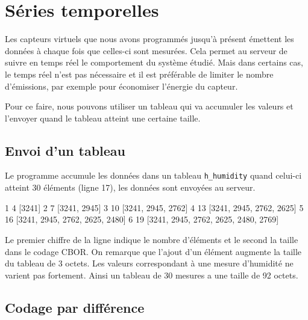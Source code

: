 \cleardoublepage

\chapter{Séries temporelles}

\begin{figure}
\end{figure}

Les capteurs virtuels que nous avons programmés jusqu’à présent émettent les données à chaque fois que celles-ci sont mesurées. 
Cela permet au serveur de suivre en temps réel le comportement du système étudié. 
Mais dans certains cas, le temps réel n’est pas nécessaire et il est préférable de limiter le nombre d’émissions, par exemple pour économiser l'énergie du capteur.

Pour ce faire, nous pouvons utiliser un tableau qui va accumuler les valeurs et l’envoyer quand le tableau atteint une certaine taille.


\section{Envoi d'un tableau}

Le programme  accumule les données dans un tableau \texttt{h\_humidity} quand celui-ci atteint 30 éléments (ligne 17), les données sont envoyées au serveur.




\begin{termc}[backgroundcolor=\color{palerod}, basicstyle=\ttfamily\small, escapechar=\#]
1 4 [3241]
2 7 [3241, 2945]
3 10 [3241, 2945, 2762]
4 13 [3241, 2945, 2762, 2625]
5 16 [3241, 2945, 2762, 2625, 2480]
6 19 [3241, 2945, 2762, 2625, 2480, 2769]
\end{termc}

Le premier chiffre de la ligne indique le nombre d'éléments et le second la taille dans le codage CBOR. On remarque que l'ajout d'un élément augmente la taille du tableau de 3 octets. Les valeurs correspondant à une mesure d'humidité ne varient pas fortement. Ainsi un tableau de 30 mesures a une taille de 92 octets.

\section{Codage par différence}

